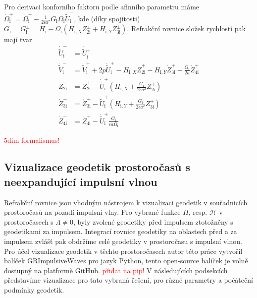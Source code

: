 Pro derivaci konforního faktoru podle afinního parametru máme
$\dot{\Omega}_{\mathrm{i}}^{+} = \dot{\Omega}^{-}_{\mathrm{i}} - \frac{1}{2 \epsilon a^2} G_{\mathrm{i}} \Omega_{\mathrm{i}}  \dot{\tilde{U}}^{-}_{\mathrm{i}}$, kde (díky spojitosti) $G_{\mathrm{i}}=G_{\mathrm{i}}^{\pm} = H_{\mathrm{i}} - \Omega_{\mathrm{i}}(H_{\mathrm{i}, X} Z_{2\mathrm{i}}^{\pm} + H_{\mathrm{i}, Y}Z_{3\mathrm{i}}^{\pm})$.
Refrakční rovnice složek rychlostí pak mají tvar
\begin{equation}
    \begin{split}
        \dot{\tilde{U}}^{-}_{\mathrm{i}} &= \dot{\tilde{U}}{}^{+}_{\mathrm{i}} \\
        \dot{\tilde{V}}^{-}_{\mathrm{i}} &= \dot{\tilde{V}}^{+}_{\mathrm{i}} + 2 p \dot{\tilde{U}}^{+}_{\mathrm{i}} - H_{\mathrm{i}, X} \dot Z_{2\mathrm{i}}^{+} - H_{\mathrm{i}, Y} \dot Z_{3\mathrm{i}}^{+} - \frac{G_\mathrm{i}}{2a} \dot Z_{4\mathrm{i}}^{+} \\
        \dot Z_{2\mathrm{i}}^{-} &= \dot Z_{2\mathrm{i}}^{+} - \dot{\tilde{U}}^{+}_{\mathrm{i}} \left( H_{\mathrm{i},X} + \frac{G_{\mathrm{i}}}{2 \epsilon a^2} Z_{2\mathrm{i}}^{+}\right) \\
        \dot Z_{3\mathrm{i}}^{-} &= \dot Z_{3\mathrm{i}}^{+} - \dot{\tilde{U}}^{+}_{\mathrm{i}} \left( H_{\mathrm{i},Y} + \frac{G_{\mathrm{i}}}{2 \epsilon a^2} Z_{3\mathrm{i}}^{+}\right) \\
        \dot Z_{4\mathrm{i}}^{-} &= \dot Z_{4\mathrm{i}}^{+} - \dot{\tilde{U}}^{+}_{\mathrm{i}} \frac{G_{\mathrm{i}}}{\epsilon a \Omega_{\mathrm{i}}}
    \end{split}
\end{equation}

\textcolor{red}{5dim formalismus!}

\subsection{Vizualizace geodetik prostoročasů s neexpandující impulsní vlnou}
Refrakční rovnice jsou vhodným nástrojem k vizualizaci geodetik v souřadnicích prostoročasů na pozadí impulsní vlny.
Pro vybrané funkce $H$, resp. $\mathcal{H}$ v prostoročasech s $\Lambda \neq 0$, byly zvolené geodetiky před impulsem ztotožněny
s geodetikami za impulsem. Integrací rovnice geodetiky na oblastech před a za impulsem zvlášť pak obdržíme celé geodetiky v prostoročasu s
impulsní vlnou. Pro účel vizualizace geodetik v těchto prostoročasech autor této práce vytvořil balíček GRImpulsiveWaves pro jazyk Python,
tento open-source balíček je volně dostupný na platformě GitHub. \textcolor{red}{přidat na pip!} V následujících podsekcích
představíme vizualizace pro tato vybraná řešení, pro různé parametry a počáteční podmínky geodetik.

